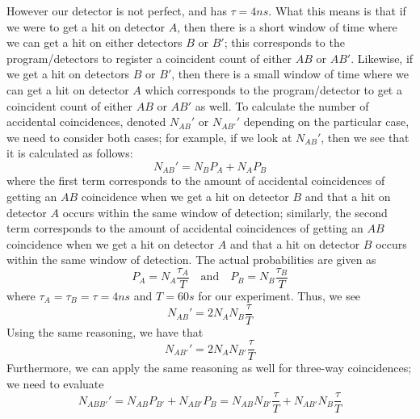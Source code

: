 \documentclass[twocolumn,amsmath,amssymb,pra]{revtex4-2}
\begin{document}
However our detector is not perfect, and has $\tau = 4 \si{ns}$. What this means is that if we were to get a hit on detector $A$, then there is a short window of time where we can get a hit on either detectors $B$ or $B'$; this corresponds to the program/detectors to register a coincident count of either $AB$ or $AB'$. Likewise, if we get a hit on detectors $B$ or $B'$, then there is a small window of time where we can get a hit on detector $A$ which corresponds to the program/detector to get a coincident count of either $AB$ or $AB'$ as well. To calculate the number of accidental coincidences, denoted $N_{AB}'$ or $N_{AB'}'$ depending on the particular case, we need to consider both cases; for example, if we look at $N_{AB}'$, then we see that it is calculated as follows:
\begin{equation}
    N_{AB}'
    =
    N_{B} P_{A} + N_{A} P_{B}
\end{equation}
where the first term corresponds to the amount of accidental coincidences of getting an $AB$ coincidence when we get a hit on detector $B$ and that a hit on detector $A$ occurs within the same window of detection; similarly, the second term corresponds to the amount of accidental coincidences of getting an $AB$ coincidence when we get a hit on detector $A$ and that a hit on detector $B$ occurs within the same window of detection. The actual probabilities are given as 
\begin{equation}
    P_{A} = N_{A} \frac{\tau_{A}}{T}
    \quad \mathrm{and} \quad 
    P_{B} = N_{B} \frac{\tau_{B}}{T}
\end{equation}
where $\tau_{A} = \tau_{B} = \tau = 4 \si{ns}$ and $T = 60 \si{s}$ for our experiment.
Thus, we see
\begin{equation}
    N_{AB}' = 2 N_{A} N_{B} \frac{\tau}{T}
    \label{eq:N_AB'}
\end{equation}
Using the same reasoning, we have that 
\begin{equation}
    N_{AB'}' = 2 N_{A} N_{B'} \frac{\tau}{T}
    \label{eq:N_AB''}
\end{equation}
Furthermore, we can apply the same reasoning as well for three-way coincidences; we need to evaluate 
\begin{equation}
    N_{ABB'}'
    =
    N_{AB} P_{B'} + N_{AB'} P_{B}
    =
    N_{AB} N_{B'} \frac{\tau}{T} + N_{AB'} N_{B} \frac{\tau}{T}
    \label{eq:N_ABB''}
\end{equation}
\end{document}
